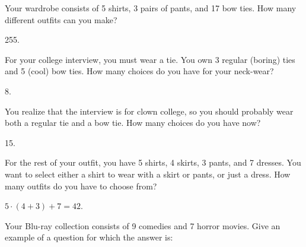 \begin{questions}

\question Your wardrobe consists of 5 shirts, 3 pairs of pants, and 17 bow ties.  How many different outfits can you make?

  \begin{answer}
    255.
  \end{answer}



\question For your college interview, you must wear a tie.  You own 3 regular (boring) ties and 5 (cool) bow ties.  How many choices do you have for your neck-wear?

  \begin{answer}
    8.
  \end{answer}




\question You realize that the interview is for clown college, so you should probably wear both a regular tie and a bow tie.  How many choices do you have now?

  \begin{answer}
    15.
  \end{answer}


\question For the rest of your outfit, you have 5 shirts, 4 skirts, 3 pants, and 7 dresses.  You want to select either a shirt to wear with a skirt or pants, or just a  dress.  How many outfits do you have to choose from?

	\begin{answer}
		$5\cdot (4+3) + 7 = 42$.
	\end{answer}




\question Your Blu-ray collection consists of 9 comedies and 7 horror movies. Give an example of a question for which the answer is:

  \begin{answer}
\end{answer}
\end{questions}
